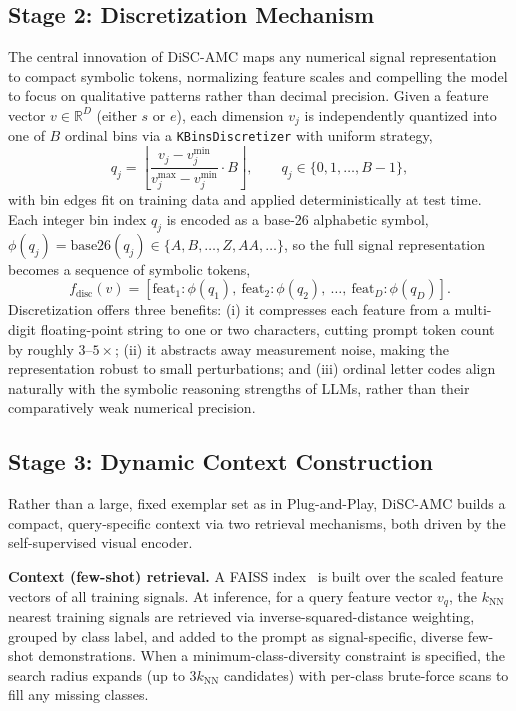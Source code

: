 \subsection{Stage 2: Discretization Mechanism}

The central innovation of DiSC-AMC maps any numerical signal representation to compact symbolic tokens, normalizing feature scales and compelling the model to focus on qualitative patterns rather than decimal precision. Given a feature vector $v \in \mathbb{R}^D$ (either $s$ or $e$), each dimension $v_j$ is independently quantized into one of $B$ ordinal bins via a \texttt{KBinsDiscretizer} with uniform strategy,
\begin{equation}
    q_j = \left\lfloor \frac{v_j - v_j^{\min}}{v_j^{\max} - v_j^{\min}} \cdot B \right\rfloor, \qquad q_j \in \{0, 1, \dots, B-1\},
\end{equation}
with bin edges fit on training data and applied deterministically at test time. Each integer bin index $q_j$ is encoded as a base-26 alphabetic symbol, $\phi(q_j) = \mathrm{base26}(q_j) \in \{A, B, \dots, Z, AA, \dots\}$, so the full signal representation becomes a sequence of symbolic tokens,
\begin{equation}
    f_{\mathrm{disc}}(v) = \left[\mathrm{feat}_1\!:\!\phi(q_1),\ \mathrm{feat}_2\!:\!\phi(q_2),\ \dots,\ \mathrm{feat}_D\!:\!\phi(q_D)\right].
\end{equation}
Discretization offers three benefits: (i) it compresses each feature from a multi-digit floating-point string to one or two characters, cutting prompt token count by roughly $3$--$5\times$; (ii) it abstracts away measurement noise, making the representation robust to small perturbations; and (iii) ordinal letter codes align naturally with the symbolic reasoning strengths of LLMs, rather than their comparatively weak numerical precision.

\subsection{Stage 3: Dynamic Context Construction}

Rather than a large, fixed exemplar set as in Plug-and-Play, DiSC-AMC builds a compact, query-specific context via two retrieval mechanisms, both driven by the self-supervised visual encoder.

\textbf{Context (few-shot) retrieval.} A FAISS index~\cite{faiss_douze2025} is built over the scaled feature vectors of all training signals. At inference, for a query feature vector $v_q$, the $k_{\mathrm{NN}}$ nearest training signals are retrieved via inverse-squared-distance weighting, grouped by class label, and added to the prompt as signal-specific, diverse few-shot demonstrations. When a minimum-class-diversity constraint is specified, the search radius expands (up to $3k_{\mathrm{NN}}$ candidates) with per-class brute-force scans to fill any missing classes.

